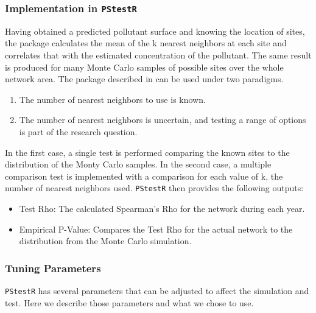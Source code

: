 \documentclass{article}
\begin{document}
\subsubsection*{Implementation in \texttt{PStestR}}
\label{subsubsec:implementation}
Having obtained a predicted pollutant surface and knowing the location of sites, the package calculates the mean of the \gls{k} nearest neighbors at each site and correlates that with the estimated concentration of the pollutant. The same result is produced for many Monte Carlo samples of possible sites over the whole network area.
The package described in \cite{watson2020} can be used under two paradigms. 
\begin{enumerate}
    \item The number of nearest neighbors to use is known.
    \item The number of nearest neighbors is uncertain, and testing a range of options is part of the research question.
\end{enumerate}
In the first case, a single test is performed comparing the known sites to the distribution of the Monty Carlo samples.  In the second case, a multiple comparison test is implemented with a comparison for each value of \gls{k}, the number of nearest neighbors used.  \texttt{PStestR} then provides the following outputs:
\begin{itemize}
    \item Test Rho:  The calculated Spearman's Rho for the network during each year.
    \item Empirical P-Value:  Compares the Test Rho for the actual network to the distribution from the Monte Carlo simulation.
\end{itemize}

\subsubsection*{Tuning Parameters}
\label{subsubsec:tuneparameters}
\texttt{PStestR} has several parameters that can be adjusted to affect the simulation and test.  Here we describe those parameters and what we chose to use.
\end{document}
